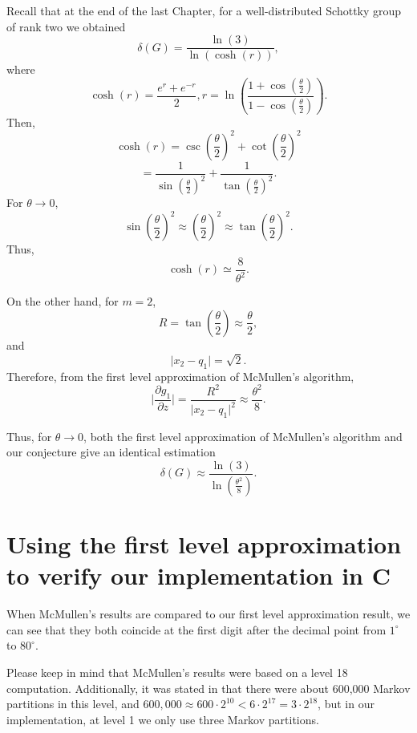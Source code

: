 \documentclass[12pt,oneside]{sfsuthesis}
\theoremstyle{plain} %
\theoremstyle{definition}  %
\theoremstyle{remark}  %
\theoremstyle{plain}
\begin{document}
{Recall that at the end of the last Chapter, for a well-distributed Schottky group of rank two we obtained
$$
\delta(G)=\frac{\ln\left( 3\right)}{\ln\left( \cosh\left( r\right)\right)},
$$
where 
$$
\cosh(r)=\frac{e^r+e^{-r}}{2}, r=\ln\left( \frac{1+\cos\left(\frac{\theta}{2}\right)}{1-\cos\left(\frac{\theta}{2}\right)}\right).
$$
Then,
$$
\cosh\left( r\right)=\csc\left(\frac{\theta}{2}\right)^2+\cot\left(\frac{\theta}{2}\right)^2
$$
$$
=\frac{1}{\sin\left(\frac{\theta}{2}\right)^2}+\frac{1}{\tan\left(\frac{\theta}{2}\right)^2}.
$$
For $\theta\to 0$, 
$$
\sin\left(\frac{\theta}{2}\right)^2\approx \left(\frac{\theta}{2}\right)^2 \approx \tan\left(\frac{\theta}{2}\right)^2.
$$
Thus, 
$$
\cosh\left( r\right)\simeq \frac{8}{\theta^2}.
$$

On the other hand, for $m=2$,  
$$
R=\tan\left(\frac{\theta}{2}\right)\approx \frac{\theta}{2},
$$
and
$$
\vert x_2-q_1\vert=\sqrt{2}.
$$
Therefore, from the first level approximation of McMullen's algorithm, 
$$
\bigg|\frac{\partial g_1}{\partial z}\bigg|=\frac{R^2}{\vert x_2-q_1\vert^2} \approx \frac{\theta^2}{8}.
$$

Thus, for $\theta\to 0$, both the first level approximation of McMullen's algorithm and our conjecture give an identical estimation
$$
\delta(G)\approx \frac{\ln\left( 3\right)}{\ln\left( \frac{\theta^2}{8}\right)}.
$$




\section{Using the first level approximation to verify our implementation in C}

When McMullen's results\cite{mcmullen1998hausdorff} are compared to our first level approximation result, we can see that they both coincide at the first digit after the decimal point from $1^\circ$ to $80^\circ$.

Please keep in mind that McMullen's results were based on a level 18 computation. Additionally, it was stated in \cite{mcmullen1998hausdorff} that there were about 600,000 Markov partitions in this level, and $600,000\approx 600\cdot 2^{10} < 6 \cdot 2^{17}= 3 \cdot  2^{18}$, but in our implementation, at level 1 we only use three Markov partitions.

}
\end{document}
